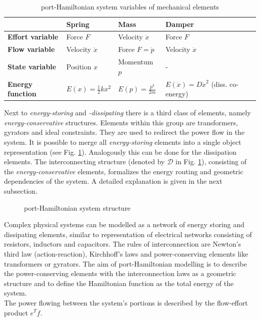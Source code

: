 \documentclass[a4paper,twoside, openright,12pt]{report}
\begin{document}
\begin{table}
	\centering
	\caption[port-Hamiltonian system variables of mechanical elements]{port-Hamiltonian system variables of mechanical elements}\vspace{10pt}
	\label{TAB:PHSvar_mechanic}
	
	\begin{tabular}{ l | l | l | l }
		& \textbf{Spring} & \textbf{Mass} & \textbf{Damper} \\ \hline
		\textbf{Effort variable} & Force $F$ & Velocity $\dot{x}$ & Force $ F $ \\ \hline
		\textbf{Flow variable} & Velocity $ \dot{x} $ & Force $ F = \dot{p} $ & Velocity $ \dot{x} $ \\ \hline
		\textbf{State variable} & Position $x$ & Momentum $ p $ & - \\ \hline
		\textbf{Energy function} & $ E(x) = \frac{1}{2}kx^2 $ & $ E(p) = \frac{p^2}{2m} $ & $E(\dot{x}) = D\dot{x}^2  $ (diss. co-energy) \\ 
	\end{tabular}
\end{table}

Next to \emph{energy-storing} and \emph{-dissipating} there is a third class of elements, namely \emph{energy-conservative} structures. Elements within this group are transformers, gyrators and ideal constraints. They are used to redirect the power flow in the system. It is possible to merge all \emph{energy-storing} elements into a single object representation (see Fig. \ref{FIG:pHsstructure}). Analogously this can be done for the dissipation elements. The interconnecting structure (denoted by $\mathcal{D}$ in Fig. \ref{FIG:pHsstructure}), consisting of the \emph{energy-conservative} elements, formalizes the energy routing and geometric dependencies of the system. A detailed explanation is given in the next subsection.


\begin{figure}[b!]
	\centering
	\small
	\def\svgwidth{0.6\columnwidth}
	
	\caption{port-Hamiltonian system structure}
	\label{FIG:pHsstructure}
\end{figure}

Complex physical systems can be modelled as a network of energy storing and dissipating elements, similar to representation of electrical networks consisting of resistors, inductors and capacitors. The rules of interconnection are Newton's third law (action-reaction), Kirchhoff's laws and power-conserving elements like transformers or gyrators. The aim of port-Hamiltonian modelling is to describe the power-conserving elements with the interconnection laws as a geometric structure and to define the Hamiltonian function as the total energy of the system. \\
The power flowing between the system's portions is described by the flow-effort product $e^Tf$.
\end{document}
